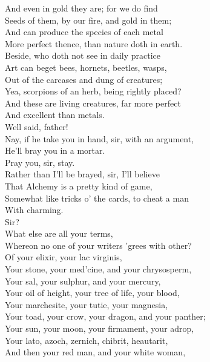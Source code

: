 \documentclass[a4paper,oneside]{memoir}
\begin{document}
\begin{drama*}
And even in gold they are; for we do find\\
Seeds of them, by our fire, and gold in them;\\
And can produce the species of each metal\\
More perfect thence, than nature doth in earth.\\
Beside, who doth not see in daily practice\\
Art can beget bees, hornets, beetles, wasps,\\
Out of the carcases and dung of creatures;\\
Yea, scorpions of an herb, being rightly placed?\\
And these are living creatures, far more perfect\\
And excellent than metals.\\
\mammonspeaks {} Well said, father!\\
Nay, if he take you in hand, sir, with an argument,\\
He'll bray you in a mortar.\\
\surlyspeaks {} Pray you, sir, stay.\\
Rather than I'll be brayed, sir, I'll believe\\
That Alchemy is a pretty kind of game,\\
Somewhat like tricks o' the cards, to cheat a man\\
With charming.\\
\subtlespeaks {} Sir?\\
\surlyspeaks {} What else are all your terms,\\
Whereon no one of your writers 'grees with other?\\
Of your elixir, your lac virginis,\\
Your stone, your med'cine, and your chrysosperm,\\
Your sal, your sulphur, and your mercury,\\
Your oil of height, your tree of life, your blood,\\
Your marchesite, your tutie, your magnesia,\\
Your toad, your crow, your dragon, and your panther;\\
Your sun, your moon, your firmament, your adrop,\\
Your lato, azoch, zernich, chibrit, heautarit,\\
And then your red man, and your white woman,\\

\end{drama*}
\end{document}
